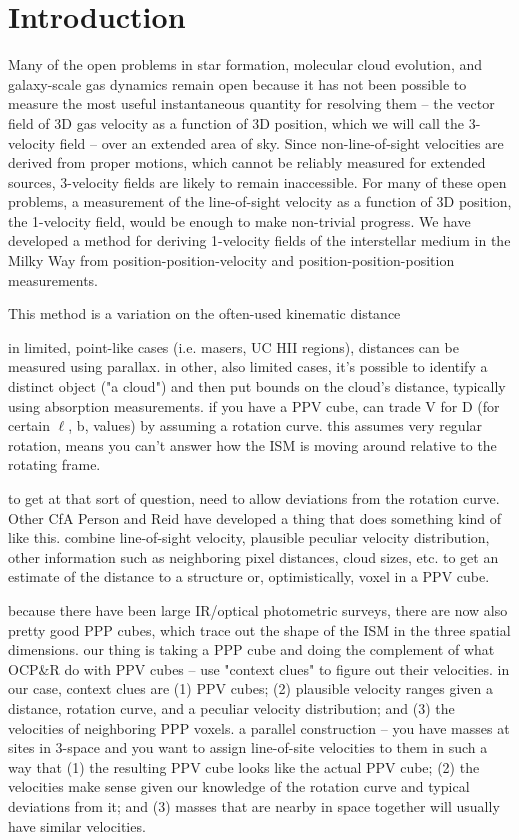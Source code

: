 \section{Introduction}
Many of the open problems in star formation, molecular cloud evolution, and galaxy-scale gas dynamics remain open because it has not been possible to measure the most useful instantaneous quantity for resolving them -- the vector field of 3D gas velocity as a function of 3D position, which we will call the 3-velocity field -- over an extended area of sky.
Since non-line-of-sight velocities are derived from proper motions, which cannot be reliably measured for extended sources, 3-velocity fields are likely to remain inaccessible. 
For many of these open problems, a measurement of the line-of-sight velocity as a function of 3D position, the 1-velocity field, would be enough to make non-trivial progress. 
We have developed a method for deriving 1-velocity fields of the interstellar medium in the Milky Way from position-position-velocity and position-position-position measurements. 

This method is a variation on the often-used kinematic distance

in limited, point-like cases (i.e. masers, UC HII regions), distances can be measured using parallax.
in other, also limited cases, it's possible to identify a distinct object ("a cloud") and then put bounds on the cloud's distance, typically using absorption measurements. 
if you have a PPV cube, can trade V for D (for certain $\ell$, b, values) by assuming a rotation curve. 
this assumes very regular rotation, means you can't answer how the ISM is moving around relative to the rotating frame.

to get at that sort of question, need to allow deviations from the rotation curve.
Other CfA Person and Reid have developed a thing that does something kind of like this. 
combine line-of-sight velocity, plausible peculiar velocity distribution, other information such as neighboring pixel distances, cloud sizes, etc. to get an estimate of the distance to a structure or, optimistically, voxel in a PPV cube.

because there have been large IR/optical photometric surveys, there are now also pretty good PPP cubes, which trace out the shape of the ISM in the three spatial dimensions. 
our thing is taking a PPP cube and doing the complement of what OCP\&R do with PPV cubes -- use "context clues" to figure out their velocities.
in our case, context clues are (1) PPV cubes; (2) plausible velocity ranges given a distance, rotation curve, and a peculiar velocity distribution; and (3) the velocities of neighboring PPP voxels. 
a parallel construction -- you have masses at sites in 3-space and you want to assign line-of-site velocities to them in such a way that (1) the resulting PPV cube looks like the actual PPV cube; (2) the velocities make sense given our knowledge of the rotation curve and typical deviations from it; and (3) masses that are nearby in space together will usually have similar velocities.


